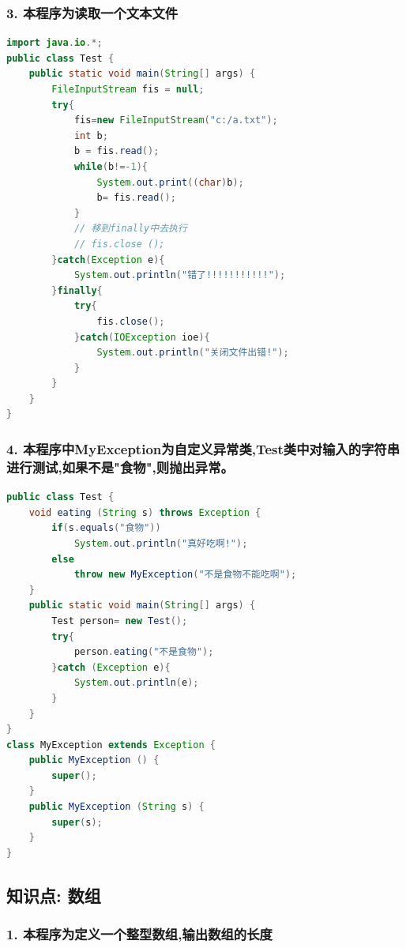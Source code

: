 \documentclass[a4paper,12pt]{article}
\begin{document}
\subsubsection{3. 本程序为读取一个文本文件}

\begin{lstlisting}[language=Java, caption=读取一个文本文件]
import java.io.*;
public class Test {
    public static void main(String[] args) {
        FileInputStream fis = null;
        try{
            fis=new FileInputStream("c:/a.txt");
            int b;
            b = fis.read();
            while(b!=-1){
                System.out.print((char)b);
                b= fis.read();
            }
            // 移到finally中去执行
            // fis.close ();
        }catch(Exception e){
            System.out.println("错了!!!!!!!!!!!");
        }finally{
            try{
                fis.close();
            }catch(IOException ioe){
                System.out.println("关闭文件出错!");
            }
        }
    }
}
\end{lstlisting}

\subsubsection{4. 本程序中MyException为自定义异常类,Test类中对输入的字符串进行测试,如果不是"食物",则抛出异常。}

\begin{lstlisting}[language=Java, caption=自定义异常测试]
public class Test {
    void eating (String s) throws Exception {
        if(s.equals("食物"))
            System.out.println("真好吃啊!");
        else
            throw new MyException("不是食物不能吃啊");
    }
    public static void main(String[] args) {
        Test person= new Test();
        try{
            person.eating("不是食物");
        }catch (Exception e){
            System.out.println(e);
        }
    }
}
class MyException extends Exception {
    public MyException () {
        super();
    }
    public MyException (String s) {
        super(s);
    }
}
\end{lstlisting}

\subsection{知识点: 数组}

\subsubsection{1. 本程序为定义一个整型数组,输出数组的长度}
\end{document}
